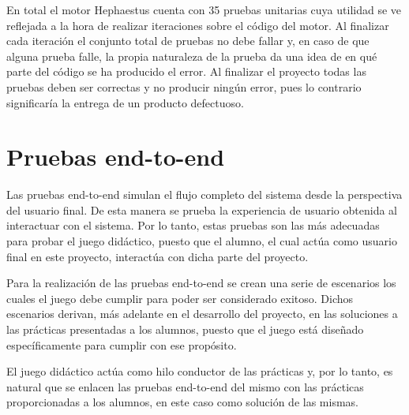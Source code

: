 En total el motor Hephaestus cuenta con 35 pruebas unitarias cuya utilidad se ve reflejada a la hora de realizar iteraciones sobre el código del motor. Al finalizar cada iteración el conjunto total de pruebas no debe fallar y, en caso de que alguna prueba falle, la propia naturaleza de la prueba da una idea de en qué parte del código se ha producido el error. Al finalizar el proyecto todas las pruebas deben ser correctas y no producir ningún error, pues lo contrario significaría la entrega de un producto defectuoso.

\section{Pruebas end-to-end}

Las pruebas end-to-end simulan el flujo completo del sistema desde la perspectiva del usuario final. De esta manera se prueba la experiencia de usuario obtenida al interactuar con el sistema. Por lo tanto, estas pruebas son las más adecuadas para probar el juego didáctico, puesto que el alumno, el cual actúa como usuario final en este proyecto, interactúa con dicha parte del proyecto.

Para la realización de las pruebas end-to-end se crean una serie de escenarios los cuales el juego debe cumplir para poder ser considerado exitoso. Dichos escenarios derivan, más adelante en el desarrollo del proyecto, en las soluciones a las prácticas presentadas a los alumnos, puesto que el juego está diseñado específicamente para cumplir con ese propósito.

El juego didáctico actúa como hilo conductor de las prácticas y, por lo tanto, es natural que se enlacen las pruebas end-to-end del mismo con las prácticas proporcionadas a los alumnos, en este caso como solución de las mismas.